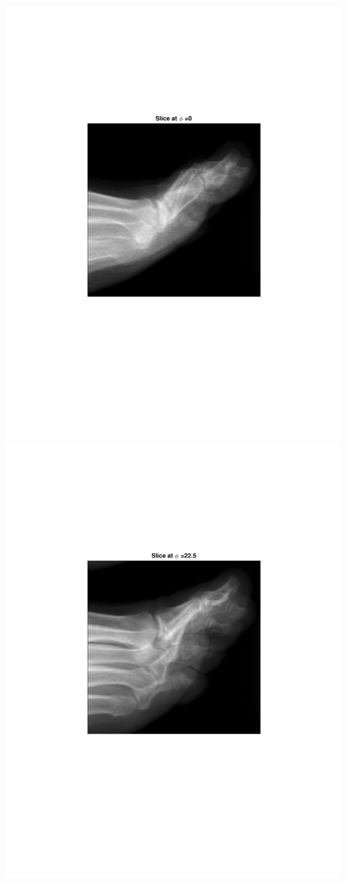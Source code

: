 \documentclass{UCF_ETD}
\begin{document}
\begin{figure}[H]   
\begin{center}
\includegraphics[scale=0.5]{FVR/FootSlice0}
\includegraphics[scale=0.5]{FVR/FootSlice23}

\end{center}
\end{figure}
\end{document}
